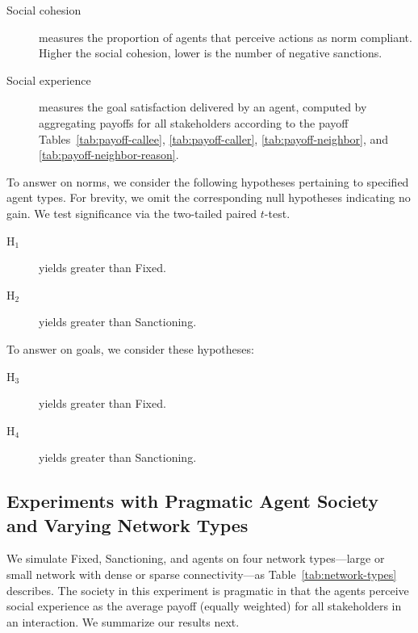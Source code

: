 \begin{description}
\item[Social cohesion] measures the proportion of agents that perceive actions
as norm compliant. Higher the social cohesion, lower is the number of negative sanctions.

\item[Social experience] measures the goal satisfaction delivered by an agent, 
computed by aggregating payoffs for all stakeholders according to
the payoff Tables~\ref{tab:payoff-callee}, \ref{tab:payoff-caller},
\ref{tab:payoff-neighbor}, and \ref{tab:payoff-neighbor-reason}.

\end{description}

To answer  on norms, we consider the following hypotheses pertaining to specified agent types. For brevity, we omit 
the corresponding null hypotheses indicating no gain. We test significance via the two-tailed paired $t$-test. 
\begin{description}
\item[H$_1$] \frameworkB yields greater  than Fixed.
\item[H$_2$] \frameworkB yields greater  than Sanctioning.
\end{description}

To answer  on goals, we consider these hypotheses:
\begin{description}
\item[H$_3$] \frameworkB yields greater  than Fixed.
\item[H$_4$] \frameworkB yields greater  than Sanctioning.
\end{description}



\subsection{Experiments with Pragmatic Agent Society and Varying Network Types}
\label{sec:experiment1}

We simulate Fixed, Sanctioning, and \frameworkB agents on four network types---large or small network with dense or sparse connectivity---as Table~\ref{tab:network-types} describes. The society in this experiment is pragmatic in that the agents perceive social experience as the average payoff (equally weighted) for all stakeholders in an interaction.
%
We summarize our results next.


